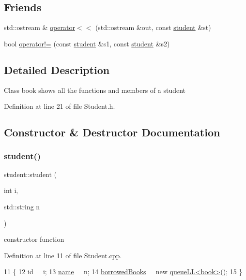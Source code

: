 \subsection*{Friends}
\begin{DoxyCompactItemize}
\item 
std\+::ostream \& \hyperlink{classstudent_a73f5ef786ecabf4118c6606f42829606}{operator$<$$<$} (std\+::ostream \&out, const \hyperlink{classstudent}{student} \&st)
\item 
bool \hyperlink{classstudent_aaaddafca542c39f7442b1807ba5600c3}{operator!=} (const \hyperlink{classstudent}{student} \&s1, const \hyperlink{classstudent}{student} \&s2)
\end{DoxyCompactItemize}


\subsection{Detailed Description}
Class book shows all the functions and members of a student 

Definition at line 21 of file Student.\+h.



\subsection{Constructor \& Destructor Documentation}
\mbox{\label{classstudent_a12856a6274dafe06723815e464b6a336}} 
\subsubsection{\texorpdfstring{student()}{student()}\hspace{0.1cm}{\footnotesize\ttfamily [1/2]}}
{\footnotesize\ttfamily student\+::student (\begin{DoxyParamCaption}\item[{int}]{i,  }\item[{std\+::string}]{n }\end{DoxyParamCaption})}

constructor function 

Definition at line 11 of file Student.\+cpp.


\begin{DoxyCode}
11                                      \{
12     \textcolor{keywordtype}{id} = i;
13     \hyperlink{classstudent_a8bba46a454eaecf8619a68c4c38c7b8d}{name} =  n;
14     \hyperlink{classstudent_ab477f6c1525709586ea41364dc8c568b}{borrowedBooks} = \textcolor{keyword}{new} \hyperlink{classqueue_l_l}{queueLL<book>}();
15 \}
\end{DoxyCode}
\mbox{\label{classstudent_a9614bbb1bed8ee2aea8aab60fe58494b}} 
